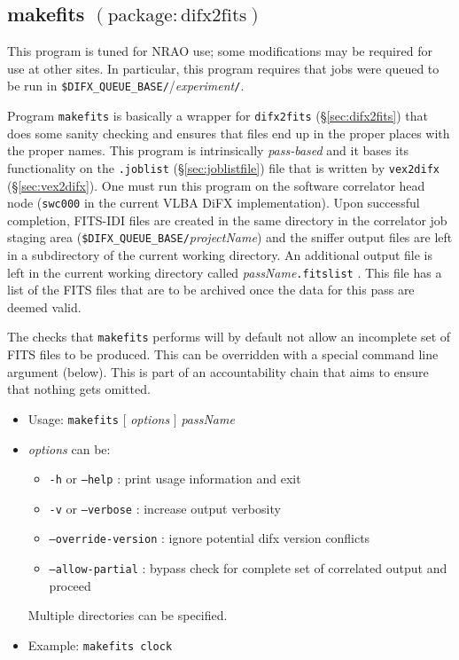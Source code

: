 
\subsection{makefits {\small $\mathrm{(package: difx2fits)}$}} \label{sec:makefits}

This program is tuned for NRAO use; some modifications may be required for use at other sites.
In particular, this program requires that jobs were queued to be run in {\tt \$DIFX\_QUEUE\_BASE/}/{\em experiment}{\tt /}.

Program {\tt makefits} is basically a wrapper for {\tt difx2fits} (\S\ref{sec:difx2fits}) that does some sanity checking and ensures that files end up in the proper places with the proper names.
This program is intrinsically {\em pass-based} and it bases its functionality on the {\tt .joblist} (\S\ref{sec:joblistfile}) file that is written by {\tt vex2difx} (\S\ref{sec:vex2difx}).
One must run this program on the software correlator head node ({\tt swc000} in the current VLBA DiFX implementation).
Upon successful completion, FITS-IDI files are created in the same directory in the correlator job staging area ({\tt \$DIFX\_QUEUE\_BASE/}{\em projectName}) and the sniffer output files are left in a subdirectory of the current working directory.
An additional output file is left in the current working directory called {\em passName}{\tt .fitslist} .
This file has a list of the FITS files that are to be archived once the data for this pass are deemed valid.

The checks that {\tt makefits} performs will by default not allow an incomplete set of FITS files to be produced.
This can be overridden with a special command line argument (below).
This is part of an accountability chain that aims to ensure that nothing gets omitted.

\begin{itemize}
\item[] Usage: {\tt makefits} $[$ {\em options} $]$ {\em passName}
\item[] {\em options} can be:
\begin{itemize}
\item[] {\tt -h} or {\tt --help} : print usage information and exit
\item[] {\tt -v} or {\tt --verbose} : increase output verbosity
\item[] {\tt --override-version} : ignore potential difx version conflicts
\item[] {\tt --allow-partial} : bypass check for complete set of correlated output and proceed
\end{itemize}
Multiple directories can be specified.
\item[] Example: {\tt makefits clock}
\end{itemize}







